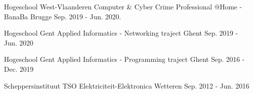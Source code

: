 

\begin{cventries}

\cventry
{Hogeschool West-Vlaanderen} %
{Computer \& Cyber Crime Professional @Home - BanaBa} %
{Brugge} %
{Sep. 2019 - Jun. 2020.} %

\cventry
{Hogeschool Gent} %
{Applied Informatics - Networking traject} %
{Ghent} %
{Sep. 2019 - Jun. 2020} %

\cventry
{Hogeschool Gent} %
{Applied Informatics - Programming traject} %
{Ghent} %
{Sep. 2016 - Dec. 2019} %

\cventry
{Scheppersinstituut} %
{TSO Elektriciteit-Elektronica} %
{Wetteren} %
{Sep. 2012 - Jun. 2016} %

\end{cventries}
